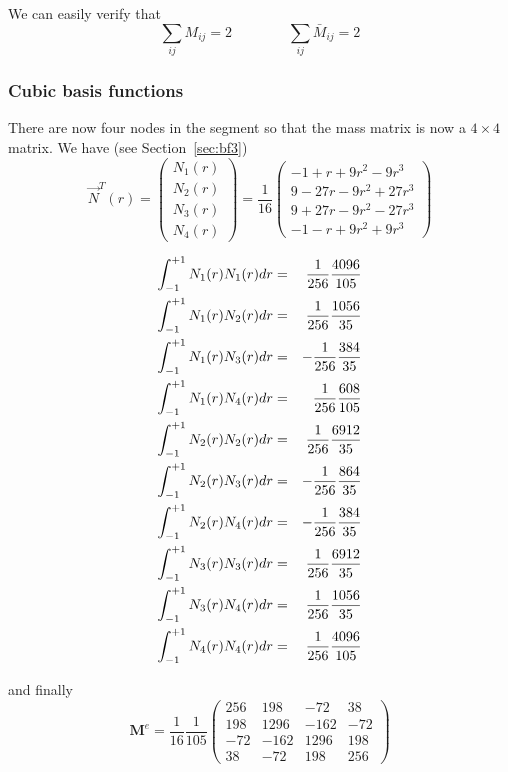 We can easily verify that
\[
\sum_{ij} M_{ij} = 2
\qquad
\qquad
\sum_{ij} \bar{M}_{ij} = 2
\]


\subsubsection{Cubic basis functions}
There are now four nodes in the segment so that the mass matrix 
is now a $4\times4$ matrix. We have (see Section~\ref{sec:bf3}) 
\begin{equation}
{\vec N}^T(r) = 
\left(
\begin{array}{c}
N_1(r) \\ 
N_2(r) \\ 
N_3(r) \\ 
N_4(r) 
\end{array}
\right)
=
\frac{1}{16}
\left(
\begin{array}{c}
 -1+  r+9r^2- 9r^3  \\ 
  9-27r-9r^2+27r^3  \\
  9+27r-9r^2-27r^3  \\
 -1-  r+9r^2+ 9r^3  
\end{array}
\right)
\end{equation}


\begin{eqnarray}
\int_{-1}^{+1} N_1(r) N_1(r) dr &=&  \frac{1}{256}\frac{4096}{105} \nonumber\\ 
\int_{-1}^{+1} N_1(r) N_2(r) dr &=&  \frac{1}{256}\frac{1056}{35} \nonumber\\
\int_{-1}^{+1} N_1(r) N_3(r) dr &=& -\frac{1}{256}\frac{384}{35} \nonumber\\
\int_{-1}^{+1} N_1(r) N_4(r) dr &=&  \frac{1}{256}\frac{608}{105} \nonumber\\
\int_{-1}^{+1} N_2(r) N_2(r) dr &=&  \frac{1}{256}\frac{6912}{35} \nonumber\\
\int_{-1}^{+1} N_2(r) N_3(r) dr &=& -\frac{1}{256}\frac{864}{35} \nonumber\\
\int_{-1}^{+1} N_2(r) N_4(r) dr &=& -\frac{1}{256}\frac{384}{35} \nonumber\\
\int_{-1}^{+1} N_3(r) N_3(r) dr &=&  \frac{1}{256}\frac{6912}{35}\nonumber\\
\int_{-1}^{+1} N_3(r) N_4(r) dr &=&  \frac{1}{256}\frac{1056}{35}\nonumber\\
\int_{-1}^{+1} N_4(r) N_4(r) dr &=&  \frac{1}{256}\frac{4096}{105}\nonumber
\end{eqnarray}

and finally 
\begin{equation}
{\bm M}^e 
=
\frac{1}{16}\frac{1}{105}
\left(
\begin{array}{cccc}
256 & 198 & -72  & 38  \\
198 & 1296 & -162 & -72 \\
-72 & -162 & 1296 & 198 \\
38 & -72 & 198 & 256
\end{array}
\right)
\end{equation}

